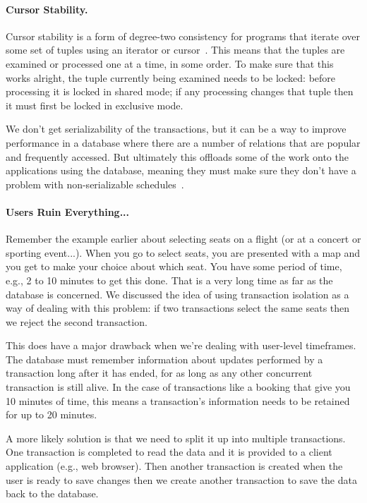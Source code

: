 \paragraph{Cursor Stability.} Cursor stability is a form of degree-two consistency for programs that iterate over some set of tuples using an iterator or cursor~\cite{dsc}. This means that the tuples are examined or processed one at a time, in some order. To make sure that this works alright, the tuple currently being examined needs to be locked: before processing it is locked in shared mode; if any processing changes that tuple then it must first be locked in exclusive mode. 

We don't get serializability of the transactions, but it can be a way to improve performance in a database where there are a number of relations that are popular and frequently accessed. But ultimately this offloads some of the work onto the applications using the database, meaning they must make sure they don't have a problem with non-serializable schedules~\cite{dsc}.

\paragraph{Users Ruin Everything...}
Remember the example earlier about selecting seats on a flight (or at a concert or sporting event...). When you go to select seats, you are presented with a map and you get to make your choice about which seat. You have some period of time, e.g., 2 to 10 minutes to get this done. That is a very long time as far as the database is concerned. We discussed the idea of using transaction isolation as a way of dealing with this problem: if two transactions select the same seats then we reject the second transaction.

This does have a major drawback when we're dealing with user-level timeframes. The database must remember information about updates performed by a transaction long after it has ended, for as long as any other concurrent transaction is still alive. In the case of transactions like a booking that give you 10 minutes of time, this means a transaction's information needs to be retained for up to 20 minutes. 

A more likely solution is that we need to split it up into multiple transactions. One transaction is completed to read the data and it is provided to a client application (e.g., web browser). Then another transaction is created when the user is ready to save changes then we create another transaction to save the data back to the database. 


